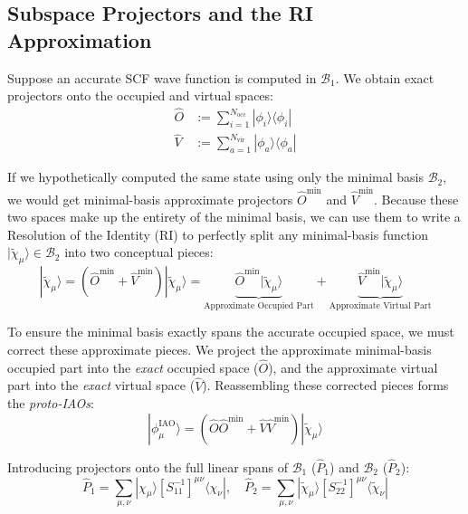 \documentclass[11pt]{article}
\newcommand{\mnote}[1]{\marginpar{\linespread{1.1}\footnotesize\textsf{\textcolor{blue}{\textbf{Margin Note:} #1}}}}
\begin{document}
\subsection{Subspace Projectors and the RI Approximation}

Suppose an accurate SCF wave function is computed in $\mathcal{B}_1$. We obtain exact projectors onto the occupied and virtual spaces:
\begin{align}
    \hat{O} &:= \sum_{i=1}^{N_{\text{occ}}} |\phi_i\rangle\langle\phi_i| \label{eq:O_exact} \\
    \hat{V} &:= \sum_{a=1}^{N_{\text{vir}}} |\phi_a\rangle\langle\phi_a|
\end{align}

If we hypothetically computed the same state using only the minimal basis $\mathcal{B}_2$, we would get minimal-basis approximate projectors $\hat{O}^{\text{min}}$ and $\hat{V}^{\text{min}}$. Because these two spaces make up the entirety of the minimal basis, we can use them to write a Resolution of the Identity (RI) to perfectly split any minimal-basis function $|\tilde{\chi}_\mu\rangle \in \mathcal{B}_2$ into two conceptual pieces:
\begin{equation}
    |\tilde{\chi}_\mu\rangle = (\hat{O}^{\text{min}} + \hat{V}^{\text{min}})|\tilde{\chi}_\mu\rangle = \underbrace{\hat{O}^{\text{min}}|\tilde{\chi}_\mu\rangle}_{\text{Approximate Occupied Part}} + \underbrace{\hat{V}^{\text{min}}|\tilde{\chi}_\mu\rangle}_{\text{Approximate Virtual Part}}
\end{equation}


To ensure the minimal basis exactly spans the accurate occupied space, we must correct these approximate pieces. We project the approximate minimal-basis occupied part into the \textit{exact} occupied space ($\hat{O}$), and the approximate virtual part into the \textit{exact} virtual space ($\hat{V}$). Reassembling these corrected pieces forms the \textit{proto-IAOs}:
\begin{equation}
    |\phi_\mu^{\text{IAO}}\rangle = (\hat{O}\hat{O}^{\text{min}} + \hat{V}\hat{V}^{\text{min}}) |\tilde{\chi}_\mu\rangle
\end{equation}

Introducing projectors onto the full linear spans of $\mathcal{B}_1$ ($\hat{P}_1$) and $\mathcal{B}_2$ ($\hat{P}_2$):
\begin{equation}
    \hat{P}_1 = \sum_{\mu,\nu} |\chi_\mu\rangle [S_{11}^{-1}]^{\mu\nu} \langle\chi_\nu|, \quad \hat{P}_2 = \sum_{\mu,\nu} |\tilde{\chi}_\mu\rangle [S_{22}^{-1}]^{\mu\nu} \langle\tilde{\chi}_\nu|
\end{equation}
\end{document}
